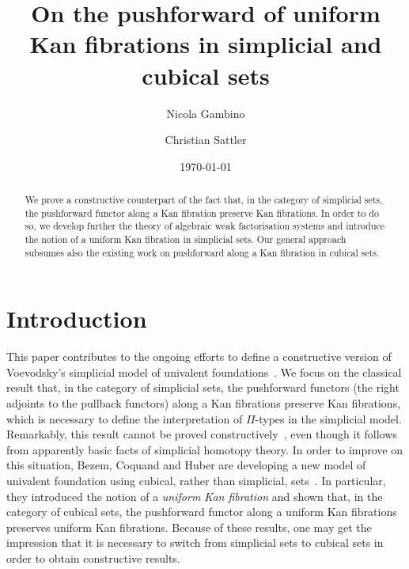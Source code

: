 \documentclass[reqno,10pt,a4paper,oneside]{amsart}
\title{On the pushforward of uniform Kan fibrations in simplicial and cubical sets}
\begin{document}
\begin{abstract}
We prove a  constructive counterpart of the fact that,
in the category of simplicial sets, the pushforward functor along a Kan fibration preserve Kan fibrations. 
In order to do so, we develop further the theory of algebraic weak factorisation systems and 
 introduce the notion of a uniform Kan fibration in simplicial sets. Our
general approach subsumes also the existing work on pushforward along
a Kan fibration in cubical sets.
\end{abstract}

\author{Nicola Gambino}
\address{School of Mathematics, University of Leeds, Leeds LS2 9JT, UK}

\author{Christian Sattler}
\address{School of Mathematics, University of Leeds, Leeds LS2 9JT, UK}

\date{\today}

\maketitle

\tableofcontents


\section{Introduction}

This paper contributes to the ongoing efforts to define a constructive version of Voevodsky's simplicial model of univalent foundations~\cite{voevodsky-simplicial-model}. We focus on the classical result that, in the category of simplicial sets, the pushforward functors (\ie the right adjoints to the pullback functors) along a Kan fibrations preserve Kan fibrations,
which is necessary to define the interpretation of $\Pi$-types in the simplicial model. Remarkably,
this result cannot be proved constructively~\cite{coquand-non-constructivity-kan}, even though it follows from apparently basic facts of simplicial homotopy theory. In order to improve on this situation, Bezem, Coquand and Huber are developing a new model of 
univalent foundation using cubical, rather than simplicial, sets~\cite{coquand-cubical-sets}. In particular, they introduced the notion of a \emph{uniform Kan fibration} and shown that, in the category of cubical sets,  
the pushforward functor along a uniform Kan fibrations preserves uniform Kan fibrations. Because of these results, one may get the impression that it is necessary to switch from simplicial sets to
cubical sets in order to obtain constructive results.
\end{document}

